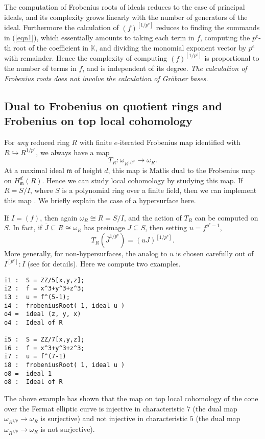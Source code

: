 \documentclass{amsart}
\newcommand{\fram}{\mathfrak{m}}
\begin{document}
The computation of Frobenius roots of ideals reduces to the case of principal ideals, and its complexity grows linearly with the number of generators of the ideal.
Furthermore the calculation of  $(f)^{[1/p^e]}$ reduces to finding the summands in (\ref{eqn1}), which essentially amounts to
taking each term in $f$, computing the $p^e$-th root of the coefficient in $\mathbb{K}$, and dividing the monomial exponent vector by $p^e$ with remainder.
Hence the complexity of computing $(f)^{[1/p^e]}$ is proportional to the number of terms in $f$, and is independent of its degree.
\emph{The calculation of Frobenius roots does not involve the calculation of Gr\"obner bases.}

\subsection{Dual to Frobenius on quotient rings and Frobenius on top local cohomology}
\label{subsec.DualToFrobeniusOnQuotientRings}
For \emph{any} reduced ring $R$ with finite $e$-iterated Frobenius map identified with $R \hookrightarrow R^{1/p^e}$, we always have a map
\[
T_R : \omega_{R^{1/p^e}} \to \omega_R.
\]
At a maximal ideal $\fram$ of height $d$, this map is Matlis dual to the Frobenius map on $H^d_{\fram}(R)$.
Hence we can study local cohomology by studying this map.
If $R = S/I$, where $S$ is a polynomial ring over a finite field, then we can implement this map \cite{FedderFPureRat, KatzmanParameterTestIdealOfCMRings}.  We briefly explain the case of a hypersurface here.

If $I = (f)$, then again $\omega_R \cong R = S/I$, and the action of $T_R$ can be computed on $S$.  In fact, if $\overline{J} \subseteq R \cong \omega_R$ has preimage  $J \subseteq S$,
then setting $u = f^{p^e-1}$,
\[
T_R({\overline J}^{1/p^e}) = \overline{(u J)^{[1/p^e]}}.
\]
More generally, for non-hypersurfaces, the analog to $u$ is chosen carefully out of $I^{[p^e]} : I$  (see \cite{KatzmanParameterTestIdealOfCMRings} for details).
Here we compute two examples.

\medskip
\begin{verbatim}
i1 :  S = ZZ/5[x,y,z];
i2 :  f = x^3+y^3+z^3;
i3 :  u = f^(5-1);
i4 :  frobeniusRoot( 1, ideal u )
o4 =  ideal (z, y, x)
o4 :  Ideal of R

i5 :  S = ZZ/7[x,y,z];
i6 :  f = x^3+y^3+z^3;
i7 :  u = f^(7-1)
i8 :  frobeniusRoot( 1, ideal u )
o8 =  ideal 1
o8 :  Ideal of R
\end{verbatim}
\medskip

The above example has shown that the map on top local cohomology of the cone over the Fermat elliptic curve is injective in characteristic $7$ (the dual map $\omega_{R^{1/p}} \to \omega_R$ is surjective) and not injective in characteristic $5$ (the dual map $\omega_{R^{1/p}} \to \omega_R$ is not surjective).
\end{document}
